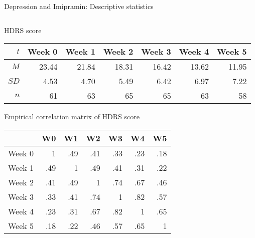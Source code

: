 \documentclass{beamer}
\begin{document}
\begin{frame}{Depression and Imipramin: Descriptive statistics}
  {\citep{ReisbyGram77}}
\begin{columns}
\begin{column}{12cm}
HDRS score
\begin{center}
\begin{tabular}{rrrrrrr}
  \hline
  $t$ & Week 0 & Week 1 & Week 2 & Week 3 & Week 4 & Week 5 \\ 
  \hline
  $M$  & 23.44 & 21.84 & 18.31 & 16.42 & 13.62 & 11.95 \\ 
  $SD$ &  4.53 & 4.70  & 5.49  & 6.42  & 6.97  & 7.22 \\ 
  $n$  & 61    & 63    & 65    & 65    & 63    & 58    \\ 
  \hline
\end{tabular}
\end{center}
Empirical correlation matrix of HDRS score
\begin{center}
\begin{tabular}{rrrrrrr}
  \hline
   & W0 & W1 & W2 & W3 & W4 & W5 \\ 
  \hline
  Week 0 &   1 & .49 & .41 & .33 & .23 & .18 \\ 
  Week 1 & .49 &   1 & .49 & .41 & .31 & .22 \\ 
  Week 2 & .41 & .49 &   1 & .74 & .67 & .46 \\ 
  Week 3 & .33 & .41 & .74 &   1 & .82 & .57 \\ 
  Week 4 & .23 & .31 & .67 & .82 &   1 & .65 \\ 
  Week 5 & .18 & .22 & .46 & .57 & .65 &   1 \\ 
  \hline
\end{tabular}
\end{center}
\end{column}
\end{columns}
\end{frame}
\end{document}

